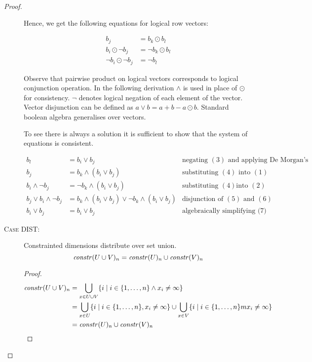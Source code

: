 \begin{proof}
\begin{description}
    Hence, we get the following equations for logical row vectors:

    \begin{align}
      b_j & = b_k \odot b_l \\
      b_i \odot \neg b_j & = \neg b_k \odot b_l \\
      \neg b_i \odot \neg b_j & = \neg b_l
    \end{align}

    Observe that pairwise product on logical vectors corresponds to logical
    conjunction operation. In the following derivation $\wedge$ is used in place
    of $\odot$ for consistency. $\neg$ denotes logical negation of each element
    of the vector. Vector disjunction can be defined as $a \vee b = a + b - a
    \odot b$. Standard boolean algebra generalises over vectors.

    To see there is always a solution it is sufficient to show that the system
    of equations is consistent.

    \begin{align}
      b_l &= b_i \vee b_j & \mbox{negating $(3)$ and applying De Morgan's law} \\
      b_j &= b_k \wedge (b_i \vee b_j) & \mbox{substituting $(4)$ into $(1)$} \\
      b_i \wedge \neg b_j &= \neg b_k \wedge (b_i \vee b_j) & \mbox{substituting $(4)$
        into $(2)$} \\
      b_j \vee b_i \wedge \neg b_j &= b_k \wedge (b_i \vee b_j) \vee \neg b_k \wedge (b_i \vee b_j) & \mbox{disjunction of $(5)$ and $(6)$} \\
      b_i \vee b_j &= b_i \vee b_j & \mbox{algebraically simplifying (7)} \nonumber
    \end{align}



  \item[\textsc{Case DIST}:]
    \begin{lemma}\label{lem:effdims}
      Constrainted dimensions distribute over set union.
      $$\mathit{constr}(U \cup V)_{n} = \mathit{constr}(U)_{n} \cup \mathit{constr}(V)_{n}$$
    \end{lemma}

    \begin{proof}
      \begin{align*}
        \mathit{constr}(U \cup V)_{n} &= \bigcup_{x \in U \cup V} \{ i \; | \; i \in \{1, \ldots, n\} \wedge x_i \neq \infty \} \\
        &= \bigcup_{x \in U} \{ i \; | \; i \in \{1, \ldots, n\}, x_i \neq \infty \} \cup
           \bigcup_{x \in V} \{ i \; | \; i \in \{1, \ldots, n\}m x_i \neq \infty \} \\
        &= \mathit{constr}(U)_{n} \cup \mathit{constr}(V)_{n} \\
      \end{align*}
    \end{proof}


\end{description}
\end{proof}
